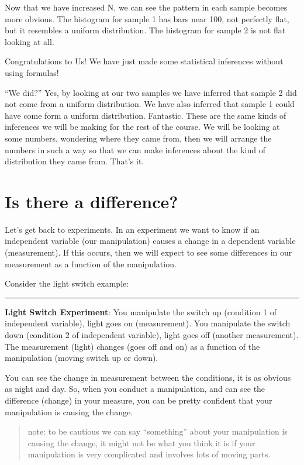 \documentclass[
  letterpaper,
  DIV=11,
  numbers=noendperiod]{scrreprt}
\begin{document}
Now that we have increased N, we can see the pattern in each sample
becomes more obvious. The histogram for sample 1 has bars near 100, not
perfectly flat, but it resembles a uniform distribution. The histogram
for sample 2 is not flat looking at all.

Congratulations to Us! We have just made some statistical inferences
without using formulas!

``We did?'' Yes, by looking at our two samples we have inferred that
sample 2 did not come from a uniform distribution. We have also inferred
that sample 1 could have come form a uniform distribution. Fantastic.
These are the same kinds of inferences we will be making for the rest of
the course. We will be looking at some numbers, wondering where they
came from, then we will arrange the numbers in such a way so that we can
make inferences about the kind of distribution they came from. That's
it.

\section{Is there a difference?}\label{is-there-a-difference}

Let's get back to experiments. In an experiment we want to know if an
independent variable (our manipulation) causes a change in a dependent
variable (measurement). If this occurs, then we will expect to see some
differences in our measurement as a function of the manipulation.

Consider the light switch example:

\begin{center}\rule{0.5\linewidth}{0.5pt}\end{center}

\textbf{Light Switch Experiment}: You manipulate the switch up
(condition 1 of independent variable), light goes on (measurement). You
manipulate the switch down (condition 2 of independent variable), light
goes off (another measurement). The measurement (light) changes (goes
off and on) as a function of the manipulation (moving switch up or
down).

You can see the change in measurement between the conditions, it is as
obvious as night and day. So, when you conduct a manipulation, and can
see the difference (change) in your measure, you can be pretty confident
that your manipulation is causing the change.

\begin{quote}
note: to be cautious we can say ``something'' about your manipulation is
causing the change, it might not be what you think it is if your
manipulation is very complicated and involves lots of moving parts.
\end{quote}
\end{document}
